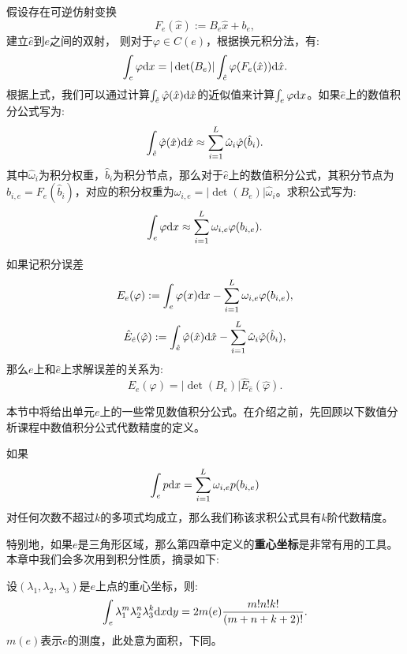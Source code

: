 假设存在可逆仿射变换
\begin{equation}
    F_{e}(\hat{x}):=B_{e}\hat{x}+b_{e},
\end{equation}
建立$\hat{e}$到$e$之间的双射，
则对于$\varphi\in C(e)$，根据换元积分法，有:
\begin{equation}
    \int_{e}\varphi\mathrm{d} x=|\det(B_{e})|\int_{\hat{e}}\varphi(F_{e}(\hat{x}))\mathrm{d}\hat{x}.
\end{equation}
根据上式，我们可以通过计算$\int_{\hat{e}}\hat{\varphi}(\hat{x})\mathrm{d}\hat{x}$的近似值来计算$\int_{e}\varphi \mathrm{d} x$。如果$\hat{e}$上的数值积分公式写为:
\begin{equation}
    \int_{\hat{e}}\hat{\varphi}(\hat{x})\mathrm{d}\hat{x}\approx\sum_{i=1}^{L}\hat{\omega}_{i}\hat{\varphi}(\hat{b}_{i}).
\end{equation}
其中$\hat{\omega}_{i}$为积分权重，$\hat{b}_{i}$为积分节点，那么对于$\hat{e}$上的数值积分公式，其积分节点为$b_{i,e}=F_{e}(\hat{b}_{i})$，对应的积分权重为$\omega_{i,e}=|\det(B_{e})|\hat{\omega}_{i}$。求积公式写为:
\begin{equation}
    \int_{e}\varphi\mathrm{d} x\approx\sum_{i=1}^{L}\omega_{i,e}\varphi(b_{i,e}).
\end{equation}
\begin{exercise}
    如果记积分误差
    \begin{equation}
        E_{e}(\varphi):=\int_{e}\varphi(x)\mathrm{d} x-\sum_{i=1}^{L}\omega_{i,e}\varphi(b_{i,e}),
    \end{equation}
    \begin{equation}
        \hat{E}_{\hat{e}}(\hat{\varphi}):=\int_{\hat{e}}\hat{\varphi}(\hat{x})\mathrm{d}\hat{x}-\sum_{i=1}^{L}\hat{\omega}_{i}\hat{\varphi}(\hat{b}_{i}),
    \end{equation}
    那么$e$上和$\hat{e}$上求解误差的关系为:
    \begin{equation}
        E_{e}(\varphi)=|\det(B_{e})|\hat{E}_{\hat{e}}(\hat{\varphi}).
    \end{equation}
\end{exercise}
本节中将给出单元$e$上的一些常见数值积分公式。在介绍之前，先回顾以下数值分析课程中数值积分公式代数精度的定义。
\begin{definition}
    如果
    \begin{equation}
    \int_{e}p\mathrm{d} x=\sum_{i=1}^{L}\omega_{i,e}p(b_{i,e})
    \end{equation}
    对任何次数不超过$k$的多项式均成立，那么我们称该求积公式具有$k$阶代数精度。
\end{definition}
特别地，如果$e$是三角形区域，那么第四章中定义的\textbf{重心坐标}是非常有用的工具。本章中我们会多次用到积分性质，摘录如下:
\begin{proposition}
    \label{eq:integral_prop}
    设$(\lambda_{1},\lambda_{2},\lambda_{3})$是$e$上点的重心坐标，则:
    \begin{equation}
        \int_{e}\lambda_{1}^{m}\lambda_{2}^{n}\lambda_{3}^{k}\mathrm{d} x\mathrm{d} y=2m(e)\frac{m!n!k!}{(m+n+k+2)!}.
    \end{equation}
    $m(e)$表示$e$的测度，此处意为面积，下同。
\end{proposition}
